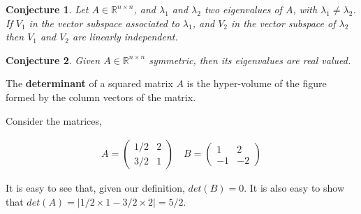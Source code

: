 \documentclass[aspectratio=169]{beamer}
\newtheorem{proposition}{Conjecture}[section]
\begin{document}
\begin{frame}
    \begin{proposition}
        Let $A\in\mathds{R}^{n\times n}$, and $\lambda_1$ and $\lambda_2$ two eigenvalues of $A$, with $\lambda_1\neq\lambda_2$. If $V_1$ in the vector subspace associated to $\lambda_1$, and $V_2$ in the vector subspace of $\lambda_2$ then $V_1$ and $V_2$ are linearly independent.
    \end{proposition}
    
    \begin{proposition}
        Given $A\in\mathds{R}^{n\times n}$ symmetric, then its eigenvalues are real valued.
    \end{proposition}
\end{frame}

\begin{frame}
    \begin{definition}
        The \textbf{determinant} of a squared matrix $A$ is the hyper-volume of the figure formed by the column vectors of the matrix.
    \end{definition}
    
    \begin{example}
        Consider the matrices,
        
        \begin{align*}
            A=\left(
            \begin{array}{cc}
                1/2 & 2 \\
                3/2 & 1
            \end{array}
            \right) \quad
            B=\left(
            \begin{array}{cc}
                1 & 2\\
                -1 & -2
            \end{array}
            \right)
        \end{align*}
    \end{example}
    
\end{frame}

\begin{frame}

    \begin{center}
    \end{center}
    
    It is easy to see that, given our definition, $det(B)=0$. It is also easy to show that $det(A)=|1/2\times1-3/2\times2|=5/2$.
    
\end{frame}
\end{document}
